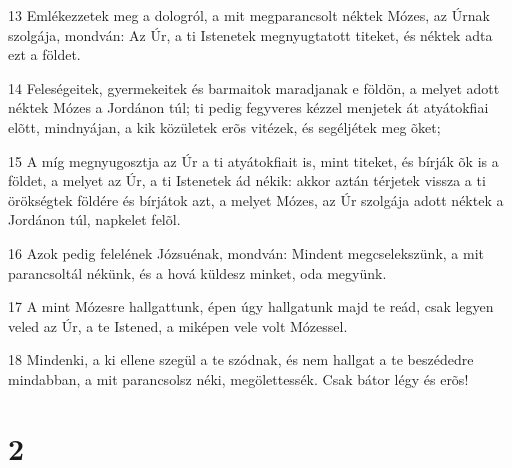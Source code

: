 \par 13 Emlékezzetek meg a dologról, a mit megparancsolt néktek Mózes, az Úrnak szolgája, mondván: Az Úr, a ti Istenetek megnyugtatott titeket, és néktek adta ezt a földet.
\par 14 Feleségeitek, gyermekeitek és barmaitok maradjanak e földön, a melyet adott néktek Mózes a Jordánon túl; ti pedig fegyveres kézzel menjetek át atyátokfiai elõtt, mindnyájan, a kik közületek erõs vitézek, és segéljétek meg õket;
\par 15 A míg megnyugosztja az Úr a ti atyátokfiait is, mint titeket, és bírják õk is a földet, a melyet az Úr, a ti Istenetek ád nékik: akkor aztán térjetek vissza a ti örökségtek földére és bírjátok azt, a melyet Mózes, az Úr szolgája adott néktek a Jordánon túl, napkelet felõl.
\par 16 Azok pedig felelének Józsuénak, mondván: Mindent megcselekszünk, a mit parancsoltál nékünk, és a hová küldesz minket, oda megyünk.
\par 17 A mint Mózesre hallgattunk, épen úgy hallgatunk majd te reád, csak legyen veled az Úr, a te Istened, a miképen vele volt Mózessel.
\par 18 Mindenki, a ki ellene szegül a te szódnak, és nem hallgat a te beszédedre mindabban, a mit parancsolsz néki, megölettessék. Csak bátor légy és erõs!

\chapter{2}

